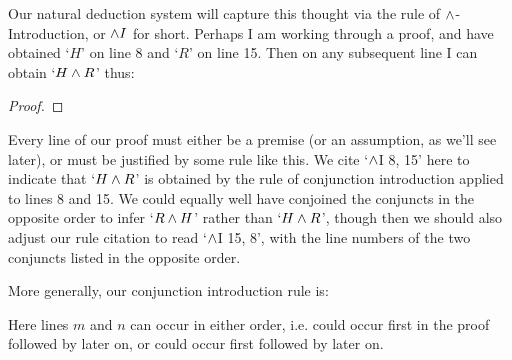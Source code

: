Our natural deduction system will capture this thought via the rule of $\wedge$-Introduction, or $\wedge I$ for short. Perhaps I am working through a proof, and have obtained `$H$' on line 8 and `$R$' on line 15. Then on any subsequent line I can obtain `$H \wedge R$' thus:
\begin{proof}
	\have[\ ]{}{\vdots}
	\have[\ ]{}{\vdots}
	 
\end{proof}
Every line of our proof must either be a premise (or an assumption, as we'll see later), or must be justified by some rule like this. We cite `$\wedge$I 8, 15' here to indicate that `$H \wedge R$' is obtained by the rule of conjunction introduction applied to lines 8 and 15. We could equally well have conjoined the conjuncts in the opposite order to infer `$R \wedge H$' rather than `$H \wedge R$', though then we should also adjust our rule citation to read `$\wedge$I 15, 8', with the line numbers of the two conjuncts listed in the opposite order.

More generally, our conjunction introduction rule is:

Here lines $m$ and $n$ can occur in either order, i.e. \meta{\varphi} could occur first in the proof followed by \meta{\psi} later on, or \meta{\psi} could occur first followed by \meta{\psi} later on.



